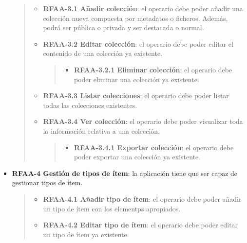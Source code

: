 \begin{itemize}
  \begin{quote}
  \begin{itemize}
  \item
    \textbf{RFAA-3.1 Añadir colección}: el operario debe poder añadir
    una colección nueva compuesta por metadatos o ficheros. Además,
    podrá ser pública o privada y ser destacada o normal.
  \item
    \textbf{RFAA-3.2 Editar colección}: el operario debe poder editar el
    contenido de una colección ya existente.

    \begin{quote}
    \begin{itemize}
    \tightlist
    \item
      \textbf{RFAA-3.2.1 Eliminar colección}: el operario debe poder
      eliminar una colección ya existente.
    \end{itemize}
    \end{quote}
  \item
    \textbf{RFAA-3.3 Listar colecciones}: el operario debe poder listar
    todas las colecciones existentes.
  \item
    \textbf{RFAA-3.4 Ver colección}: el operario debe poder visualizar
    toda la información relativa a una colección.

    \begin{quote}
    \begin{itemize}
    \tightlist
    \item
      \textbf{RFAA-3.4.1 Exportar colección}: el operario debe poder
      exportar una colección ya existente.
    \end{itemize}
    \end{quote}
  \end{itemize}
  \end{quote}
\item
  \textbf{RFAA-4 Gestión de tipos de ítem}: la aplicación tiene que ser
  capaz de gestionar tipos de ítem.

  \begin{quote}
  \begin{itemize}
  \item
    \textbf{RFAA-4.1 Añadir tipo de ítem}: el operario debe poder añadir
    un tipo de ítem con los elementps apropiados.
  \item
    \textbf{RFAA-4.2 Editar tipo de ítem}: el operario debe poder editar
    un tipo de ítem ya existente.


\end{itemize}
\end{quote}
\end{itemize}
